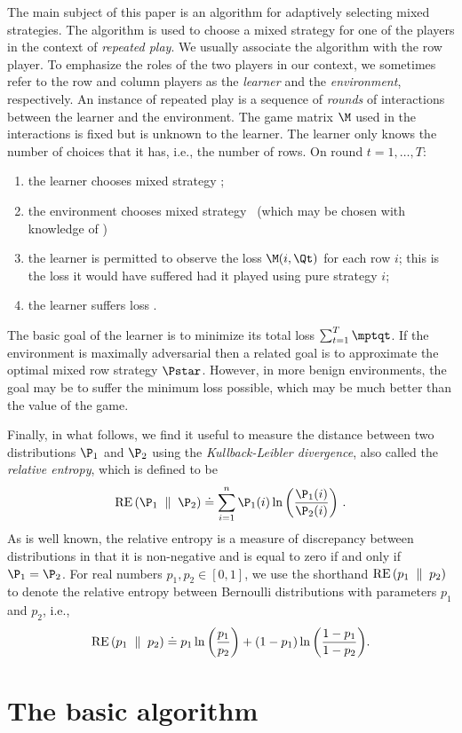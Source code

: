 The main subject of this paper is an algorithm for adaptively
selecting mixed strategies. The algorithm is used to choose a mixed
strategy for one of the players in the context of {\em repeated
play}.
We usually associate the algorithm with the row player.
To emphasize the roles of the two players in our context, we
sometimes refer to the row and column players as the {\em learner\/} and
the {\em environment}, respectively.
An instance of repeated play is a sequence of {\em rounds} of
interactions between the learner and the environment.
The game matrix $\M$ used in the interactions is fixed but is unknown
to the learner. The learner only knows the number of choices that it
has, i.e., the number of rows.
On round $t=1,\ldots,T$:
\begin{enumerate}
\item
the learner chooses mixed strategy \Pt;
\item
the environment chooses mixed strategy \Qt\ (which may be chosen with
knowledge of \Pt)
\item
the learner is permitted to observe the loss $\M(i,\Qt)$ for each row
$i$; this is the loss it would have suffered had it played using pure
strategy $i$;
\item
the learner suffers loss \mptqt.
\end{enumerate}

The basic goal of the learner is to minimize its total loss
$\sum_{t=1}^T \mptqt$. If the environment is maximally adversarial
then a related goal is to approximate the optimal mixed row strategy
$\Pstar$.
However, in more benign environments, the goal may be to suffer the
minimum loss possible, which may be much better than the value of the
game.

Finally, in what follows, we find it useful to measure the distance
between two distributions $\P_1$ and $\P_2$ using the
{\em Kullback-Leibler divergence}, also called the {\em relative
entropy}, which is defined to be
\[
\RE{\P_1}{\P_2} \doteq \sum_{i=1}^n \P_1(i) \ln \paren{\P_1(i) \over \P_2(i)}~.
\]
As is well known, the relative entropy is a measure of discrepancy
between distributions in that it is non-negative and is equal to zero
if and only if $\P_1=\P_2$.
For real numbers $p_1, p_2 \in [0,1]$, we use the shorthand
${\rm RE}\left( {p_1} \; \parallel \; {p_2} \right)$ to denote the relative entropy between Bernoulli
distributions with parameters $p_1$ and $p_2$, i.e.,
\[
{\rm RE}\left( {p_1} \; \parallel \; {p_2} \right) \doteq p_1 \ln{\left({\frac{p_1}{p_2}}\right)}
                + (1-p_1) \ln{\left({\frac{1-p_1}{1-p_2}}\right)}.
\]

\section{The basic algorithm} \label{sec:alg}

